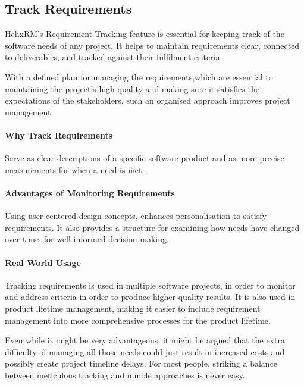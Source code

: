 \subsection{Track Requirements}\label{subsec:track-requirements}

HelixRM's Requirement Tracking feature is essential for keeping
track of the software needs of any project.
It helps to maintain requirements clear, connected to
deliverables, and tracked against their fulfilment criteria.

With a defined plan for managing the requirements,which
are essential to maintaining the project's high quality and
making sure it satisfies the expectations of the stakeholders,
such an organised approach improves project management.

\paragraph{Why Track Requirements} Serve as clear descriptions of a specific software product\cite{j_e__archer_2003}
and as more precise measurements for when a need is met\cite{evangelos_markopoulos__2009}.


\paragraph{Advantages of Monitoring Requirements}
Using user-centered design concepts, enhances personalisation to satisfy requirements\cite{maria_grazia_violante__2017}.
It also provides a structure for examining how needs have changed over time, for well-informed decision-making\cite{evangelos_markopoulos__2009}.

\paragraph{Real World Usage}
Tracking requirements is used in multiple software projects, in order to monitor and address criteria in order to produce higher-quality results\cite{edward_r__rang__1985}.
It is also used in product lifetime management, making it easier to include requirement management into more comprehensive processes for the product lifetime\cite{maria_grazia_violante__2017}.

Even while it might be very advantageous, it might be
argued that the extra difficulty of managing all those needs
could just result in increased costs and possibly create project
timeline delays.
For most people, striking a balance between meticulous
tracking and nimble approaches is never easy.

